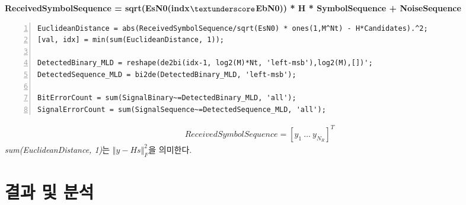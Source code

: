 \documentclass{article}
\newcommand{\bd}{\textbf} %
\begin{document}
\noindent\bd{ReceivedSymbolSequence = sqrt(EsN0(indx$\textunderscore$EbN0)) * H * SymbolSequence + NoiseSequence}
\begin{lstlisting}[style=Matlab-editor, frame=single, numbers=left,]
% 'EuclideanDistance' results in Nt x M^Nt, each column representing each candidate symbol combination
EuclideanDistance = abs(ReceivedSymbolSequence/sqrt(EsN0) * ones(1,M^Nt) - H*Candidates).^2;
[val, idx] = min(sum(EuclideanDistance, 1));

DetectedBinary_MLD = reshape(de2bi(idx-1, log2(M)*Nt, 'left-msb'),log2(M),[])';
DetectedSequence_MLD = bi2de(DetectedBinary_MLD, 'left-msb');

BitErrorCount = sum(SignalBinary~=DetectedBinary_MLD, 'all');
SignalErrorCount = sum(SignalSequence~=DetectedSequence_MLD, 'all');
\end{lstlisting}
\begin{gather}
ReceivedSymbolSequence=[y_1\ \hdots\ y_{N_R}]^T
\end{gather}
\textsl{sum(EuclideanDistance, 1)}는 $\Vert y-Hs\Vert_F^2$을 의미한다.
\section{결과 및 분석}
\end{document}
